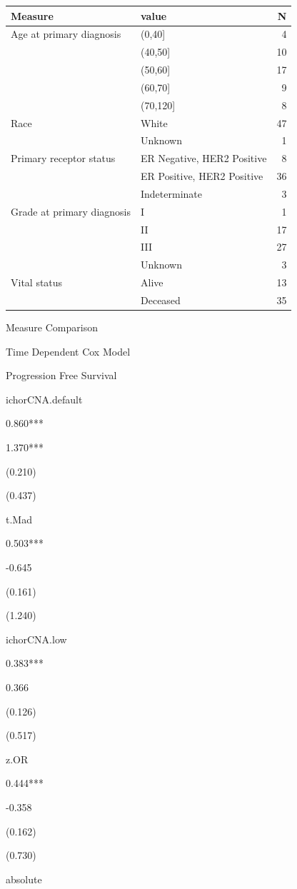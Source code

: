 \documentclass[]{article}
\begin{document}
\begin{tabular}{l|l|r}
\hline
Measure & value & N\\
\hline
Age at primary diagnosis & (0,40] & 4\\
\hline
 & (40,50] & 10\\
\hline
 & (50,60] & 17\\
\hline
 & (60,70] & 9\\
\hline
 & (70,120] & 8\\
\hline
Race & White & 47\\
\hline
 & Unknown & 1\\
\hline
Primary receptor status & ER Negative, HER2 Positive & 8\\
\hline
 & ER Positive, HER2 Positive & 36\\
\hline
 & Indeterminate & 3\\
\hline
Grade at primary diagnosis & I & 1\\
\hline
 & II & 17\\
\hline
 & III & 27\\
\hline
 & Unknown & 3\\
\hline
Vital status & Alive & 13\\
\hline
 & Deceased & 35\\
\hline
\end{tabular}

Measure Comparison

Time Dependent Cox Model

Progression Free Survival

ichorCNA.default

0.860***

1.370***

(0.210)

(0.437)

t.Mad

0.503***

-0.645

(0.161)

(1.240)

ichorCNA.low

0.383***

0.366

(0.126)

(0.517)

z.OR

0.444***

-0.358

(0.162)

(0.730)

absolute
\end{document}
